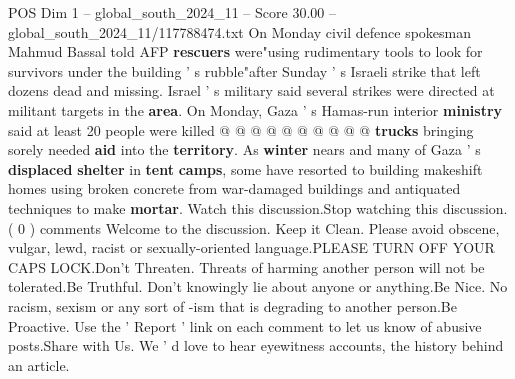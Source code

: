 \begin{textsample}{POS Dim 1 – global\_south\_2024\_11 – Score 30.00 – global\_south\_2024\_11/117788474.txt}
On Monday civil defence spokesman Mahmud Bassal told AFP \textbf{rescuers} were"using rudimentary tools to look for survivors under the building ' s rubble"after Sunday ' s Israeli strike that left dozens dead and missing.
Israel ' s military said several strikes were directed at militant targets in the \textbf{area}.
On Monday, Gaza ' s Hamas-run interior \textbf{ministry} said at least 20 people were killed @ @ @ @ @ @ @ @ @ @ \textbf{trucks} bringing sorely needed \textbf{aid} into the \textbf{territory}.
As \textbf{winter} nears and many of Gaza ' s \textbf{displaced} \textbf{shelter} in \textbf{tent} \textbf{camps}, some have resorted to building makeshift homes using broken concrete from war-damaged buildings and antiquated techniques to make \textbf{mortar}.
Watch this discussion.Stop watching this discussion. ( 0 ) comments Welcome to the discussion.
Keep it Clean.
Please avoid obscene, vulgar, lewd, racist or sexually-oriented language.PLEASE TURN OFF YOUR CAPS LOCK.Don't Threaten.
Threats of harming another person will not be tolerated.Be Truthful.
Don't knowingly lie about anyone or anything.Be Nice.
No racism, sexism or any sort of -ism that is degrading to another person.Be Proactive.
Use the ' Report ' link on each comment to let us know of abusive posts.Share with Us.
We ' d love to hear eyewitness accounts, the history behind an article.

\end{textsample}
